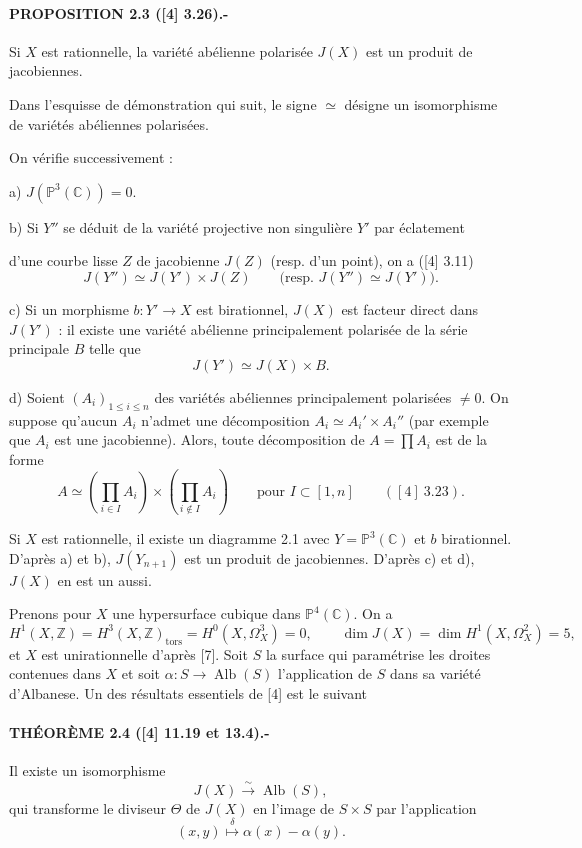 \documentclass[10pt]{article}
\newcommand{\C}{\mathbb C}
\newcommand{\PP}{\mathbb P}
\newcommand{\ZZ}{\mathbb Z}
\newcommand{\Alb}{\operatorname{Alb}}
\newcommand{\tors}{\mathrm{tors}}
\begin{document}
\paragraph{PROPOSITION 2.3 ([4] 3.26).-} Si \(X\) est rationnelle, la variété abélienne polarisée \(J(X)\) est un produit de jacobiennes.

Dans l'esquisse de démonstration qui suit, le signe \(\simeq\) désigne un isomorphisme de variétés abéliennes polarisées.

On vérifie successivement :

\noindent a) \(J(\PP^3(\C))=0\).

\noindent b) Si \(Y''\) se déduit de la variété projective non singulière \(Y'\) par éclatement

\newpage
\noindent d'une courbe lisse \(Z\) de jacobienne \(J(Z)\) (resp. d'un point), on a ([4] 3.11)
\[
  J(Y'')\simeq J(Y')\times J(Z)
  \qquad
  \bigl(\text{resp. }J(Y'')\simeq J(Y')\bigr).
\]

\noindent c) Si un morphisme \(b:Y'\to X\) est birationnel, \(J(X)\) est facteur direct dans \(J(Y')\) : il existe une variété abélienne principalement polarisée de la série principale \(B\) telle que
\[
  J(Y')\simeq J(X)\times B.
\]

\noindent d) Soient \((A_i)_{1\leq i\leq n}\) des variétés abéliennes principalement polarisées \(\ne0\). On suppose qu'aucun \(A_i\) n'admet une décomposition \(A_i\simeq A_i'\times A_i''\) (par exemple que \(A_i\) est une jacobienne). Alors, toute décomposition de \(A=\prod A_i\) est de la forme
\[
  A\simeq
  \left(\prod_{i\in I}A_i\right)
  \times
  \left(\prod_{i\notin I}A_i\right)
  \qquad\text{pour }I\subset[1,n]\qquad([4]\ 3.23).
\]

Si \(X\) est rationnelle, il existe un diagramme 2.1 avec \(Y=\PP^3(\C)\) et \(b\) birationnel. D'après a) et b), \(J(Y_{n+1})\) est un produit de jacobiennes. D'après c) et d), \(J(X)\) en est un aussi.

Prenons pour \(X\) une hypersurface cubique dans \(\PP^4(\C)\). On a
\[
  H^1(X,\ZZ)=H^3(X,\ZZ)_{\tors}=H^0(X,\Omega_X^3)=0,
  \qquad
  \dim J(X)=\dim H^1(X,\Omega_X^2)=5,
\]
et \(X\) est unirationnelle d'après [7]. Soit \(S\) la surface qui paramétrise les droites contenues dans \(X\) et soit \(\alpha:S\to\Alb(S)\) l'application de \(S\) dans sa variété d'Albanese. Un des résultats essentiels de [4] est le suivant

\paragraph{THÉORÈME 2.4 ([4] 11.19 et 13.4).-} Il existe un isomorphisme
\[
  J(X)\xrightarrow{\sim}\Alb(S),
\]
qui transforme le diviseur \(\Theta\) de \(J(X)\) en l'image de \(S\times S\) par l'application
\[
  (x,y)\overset{\delta}{\longmapsto}\alpha(x)-\alpha(y).
\]
\end{document}
